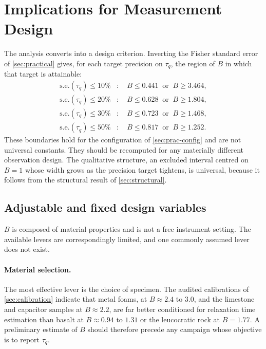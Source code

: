 \documentclass[preprint,12pt,a4paper]{elsarticle}
\theoremstyle{plain}
\theoremstyle{definition}
\theoremstyle{remark}
\newcommand{\tq}{\tau_{q}}
\newcommand{\Bnum}{B}
\begin{document}
\section{Implications for Measurement Design}
\label{sec:design}

The analysis converts into a design criterion. Inverting the Fisher standard
error of \cref{sec:practical} gives, for each target precision on $\tq$, the
region of $\Bnum$ in which that target is attainable:
%
\begin{align}
  \text{s.e.}(\tq) \leq 10\% &:\quad
    \Bnum \leq 0.441 \ \text{ or }\ \Bnum \geq 3.464 ,
  \label{eq:design10} \\
  \text{s.e.}(\tq) \leq 20\% &:\quad
    \Bnum \leq 0.628 \ \text{ or }\ \Bnum \geq 1.804 ,
  \label{eq:design20} \\
  \text{s.e.}(\tq) \leq 30\% &:\quad
    \Bnum \leq 0.723 \ \text{ or }\ \Bnum \geq 1.468 ,
  \label{eq:design30} \\
  \text{s.e.}(\tq) \leq 50\% &:\quad
    \Bnum \leq 0.817 \ \text{ or }\ \Bnum \geq 1.252 .
  \label{eq:design50}
\end{align}
%
These boundaries hold for the configuration of \cref{sec:prac-config} and are
not universal constants. They should be recomputed for any materially different
observation design. The qualitative structure, an excluded interval centred on
$\Bnum = 1$ whose width grows as the precision target tightens, is universal,
because it follows from the structural result of \cref{sec:structural}.

\subsection{Adjustable and fixed design variables}
\label{sec:design-levers}

$\Bnum$ is composed of material properties and is not a free instrument
setting. The available levers are correspondingly limited, and one commonly
assumed lever does not exist.

\paragraph{Material selection.}
The most effective lever is the choice of specimen. The audited calibrations of
\cref{sec:calibration} indicate that metal foams, at $\Bnum \approx 2.4$ to
$3.0$, and the limestone and capacitor samples at $\Bnum \approx 2.2$, are far
better conditioned for relaxation time estimation than basalt at
$\Bnum \approx 0.94$ to $1.31$ or the leucocratic rock at $\Bnum = 1.77$. A preliminary estimate of $\Bnum$ should
therefore precede any campaign whose objective is to report $\tq$.
\end{document}
